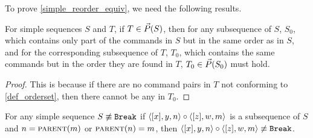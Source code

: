 To prove \cref{simple_reorder_equiv}, we need the following results.

\begin{mycor}\label{subseq_in_orderset}
For simple sequences $S$ and $T$,
if $T\in\vec{P}({S})$, then for any subsequence of $S$, $S_0$, which contains
only part of the commands in $S$ but in the same order as in $S$,
and for the corresponding subsequence of $T$, $T_0$, which
contains the same commands but in the order they are found in $T$,
$T_0\in\vec{P}({S_0})$ must hold.
\end{mycor}
\begin{proof}
This is because
if there are no command pairs in $T$ not conforming to \cref{def_orderset},
then there cannot be any in $T_0$.
\end{proof}

\begin{mylem}\label{simple_distant_pairs}
For any simple sequence $S\not\equiv\mathtt{Break}$
if $\langle{[x],y,n}\rangle\circ\langle{[z],w,m}\rangle$ is a subsequence of $S$ and $n=\text{\normalfont\scshape{parent}}(m)$ or $\text{\normalfont\scshape{parent}}(n)=m$,
then $\langle{[x],y,n}\rangle\circ\langle{[z],w,m}\rangle\not\equiv\mathtt{Break}$.
\end{mylem}
